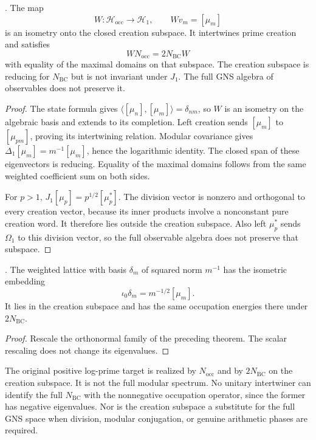 \begin{theorem}
\label{v4-arith:w5-b:occupation-comparison}
\ClaimStatusProvedHere. The map
\[
 W:\mathcal H_{\mathrm{occ}}\longrightarrow\mathcal H_1,
 \qquad Wv_m=[\mu_m]
\]
is an isometry onto the closed creation subspace. It intertwines
prime creation and satisfies
\[
 WN_{\mathrm{occ}}=2N_{\mathrm{BC}}W
\]
with equality of the maximal domains on that subspace. The
creation subspace is reducing for $N_{\mathrm{BC}}$ but is not
invariant under $J_1$. The full GNS algebra of observables does
not preserve it.
\end{theorem}

\begin{proof}
The state formula gives
$\langle[\mu_n],[\mu_m]\rangle=\delta_{nm}$, so $W$ is an
isometry on the algebraic basis and extends to its completion.
Left creation sends $[\mu_m]$ to $[\mu_{pm}]$, proving its
intertwining relation. Modular covariance gives
$\Delta_1[\mu_m]=m^{-1}[\mu_m]$, hence the logarithmic identity.
The closed span of these eigenvectors is reducing. Equality of
the maximal domains follows from the same weighted coefficient
sum on both sides.

For $p>1$, $J_1[\mu_p]=p^{1/2}[\mu_p^*]$. The division vector
is nonzero and orthogonal to every creation vector, because its
inner products involve a nonconstant pure creation word.
It therefore lies outside the creation subspace. Also left
$\mu_p^*$ sends $\Omega_1$ to this division vector, so the
full observable algebra does not preserve that subspace.
\end{proof}

\begin{lemma}
\label{v4-arith:w5-b:lem:zero-mode-embeds-gns}
\ClaimStatusProvedHere. The weighted lattice with basis
$\delta_m$ of squared norm $m^{-1}$ has the isometric embedding
\[
 \iota_0\delta_m=m^{-1/2}[\mu_m].
\]
It lies in the creation subspace and has the same occupation
energies there under $2N_{\mathrm{BC}}$.
\end{lemma}
\begin{proof}
Rescale the orthonormal family of the preceding theorem.
The scalar rescaling does not change its eigenvalues.
\end{proof}

\begin{remark}
\label{v4-arith:w5-b:rem:N-BC-not}
\label{v4-arith:w5-b:rem:embedding-domain}
The original positive log-prime target is realized by
$N_{\mathrm{occ}}$ and by $2N_{\mathrm{BC}}$ on the creation
subspace. It is not the full modular spectrum. No unitary
intertwiner can identify the full $N_{\mathrm{BC}}$ with the
nonnegative occupation operator, since the former has negative
eigenvalues. Nor is the creation subspace a substitute for the
full GNS space when division, modular conjugation, or genuine
arithmetic phases are required.
\end{remark}

